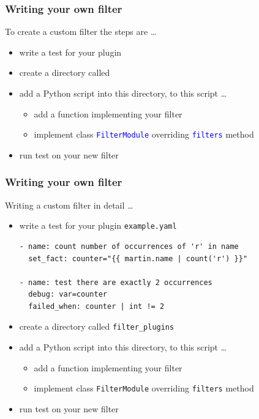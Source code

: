 \documentclass[pdf]{beamer}
\begin{document}
\begin{frame}[t,fragile]
  \frametitle{Writing your own filter}
  To create a custom filter the steps are \ldots
  \begin{itemize}[<+->]
    \item {write a test for your plugin}
    \item {create a directory called }
    \item {add a Python script into this directory, to this script \ldots}
      \begin{itemize}
        \item {add a function implementing your filter}
        \item {implement class \textcolor{blue}{\texttt{FilterModule}} overriding \textcolor{blue}{\texttt{filters}} method}
      \end{itemize}
    \item {run test on your new filter}
  \end{itemize}
\end{frame}

\begin{frame}[t,fragile]
  \frametitle{Writing your own filter}
  Writing a custom filter in detail \ldots
  \begin{itemize}
    \item \alert {write a test for your plugin \texttt{example.yaml}}
      \begin{lstlisting}
- name: count number of occurrences of 'r' in name
  set_fact: counter="{{ martin.name | count('r') }}"

- name: test there are exactly 2 occurrences
  debug: var=counter
  failed_when: counter | int != 2
      \end{lstlisting}
    \item {create a directory called \texttt{filter\_plugins}}
    \item {add a Python script into this directory, to this script \ldots}
      \begin{itemize}
        \item {add a function implementing your filter}
        \item {implement class \texttt{FilterModule} overriding \texttt{filters} method}
      \end{itemize}
    \item {run test on your new filter}
  \end{itemize}
\end{frame}
\end{document}
